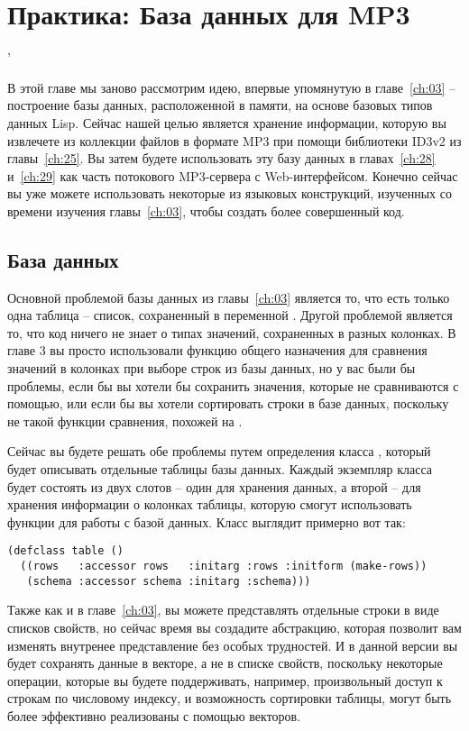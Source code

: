 \chapter{Практика: База данных для MP3}
'\label{ch:27}

В этой главе мы заново рассмотрим идею, впервые упомянутую в главе~\ref{ch:03} --
построение базы данных, расположенной в памяти, на основе базовых типов данных Lisp.
Сейчас нашей целью является хранение информации, которую вы извлечете из коллекции файлов
в формате MP3 при помощи библиотеки ID3v2 из главы~\ref{ch:25}.  Вы затем будете
использовать эту базу данных в главах~\ref{ch:28} и~\ref{ch:29} как часть потокового
MP3-сервера с Web-интерфейсом.  Конечно сейчас вы уже можете использовать некоторые из
языковых конструкций, изученных со времени изучения главы~\ref{ch:03}, чтобы создать более
совершенный код.

\section{База данных}

Основной проблемой базы данных из главы~\ref{ch:03} является то, что есть только одна
таблица -- список, сохраненный в переменной .  Другой проблемой является то,
что код ничего не знает о типах значений, сохраненных в разных колонках.  В главе 3 вы
просто использовали функцию общего назначения  для сравнения значений в
колонках при выборе строк из базы данных, но у вас были бы проблемы, если бы вы хотели бы
сохранить значения, которые не сравниваются с помощью, или если бы вы хотели
сортировать строки в базе данных, поскольку не такой функции сравнения, похожей на
.

Сейчас вы будете решать обе проблемы путем определения класса , который будет
описывать отдельные таблицы базы данных.  Каждый экземпляр класса  будет
состоять из двух слотов -- один для хранения данных, а второй -- для хранения информации о
колонках таблицы, которую смогут использовать функции для работы с базой данных.  Класс
выглядит примерно вот так:

\begin{lstlisting}
(defclass table ()
  ((rows   :accessor rows   :initarg :rows :initform (make-rows))
   (schema :accessor schema :initarg :schema)))
\end{lstlisting}

Также как и в главе~\ref{ch:03}, вы можете представлять отдельные строки в виде списков
свойств, но сейчас время вы создадите абстракцию, которая позволит вам изменять внутренее
представление без особых трудностей. И в данной версии вы будет сохранять данные в
векторе, а не в списке свойств, поскольку некоторые операции, которые вы будете
поддерживать, например, произвольный доступ к строкам по числовому индексу, и возможность
сортировки таблицы, могут быть более эффективно реализованы с помощью векторов.

